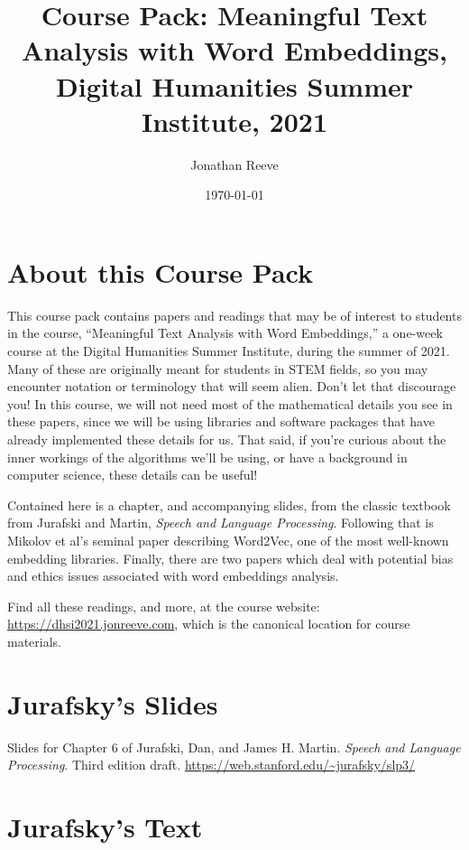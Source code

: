 \documentclass[a4paper]{report}
\title{Course Pack: Meaningful Text Analysis with Word Embeddings, Digital Humanities Summer Institute, 2021}
\author{Jonathan Reeve}
\date{\today}
\begin{document}
\maketitle

\tableofcontents

\chapter{About this Course Pack}

This course pack contains papers and readings that may be of interest to students in the course, ``Meaningful Text Analysis with Word Embeddings,'' a one-week course at the Digital Humanities Summer Institute, during the summer of 2021. Many of these are originally meant for students in STEM fields, so you may encounter notation or terminology that will seem alien. Don't let that discourage you! In this course, we will not need most of the mathematical details you see in these papers, since we will be using libraries and software packages that have already implemented these details for us. That said, if you're curious about the inner workings of the algorithms we'll be using, or have a background in computer science, these details can be useful!

Contained here is a chapter, and accompanying slides, from the classic textbook from Jurafski and Martin, \emph{Speech and Language Processing}. Following that is Mikolov et al's seminal paper describing Word2Vec, one of the most well-known embedding libraries. Finally, there are two papers which deal with potential bias and ethics issues associated with word embeddings analysis.

Find all these readings, and more, at the course website: \url{https://dhsi2021.jonreeve.com}, which is the canonical location for course materials.

\chapter{Jurafsky's Slides}

Slides for Chapter 6 of Jurafski, Dan, and James H. Martin. \emph{Speech and Language Processing}. Third edition draft. \url{https://web.stanford.edu/~jurafsky/slp3/}

  

\chapter{Jurafsky's Text}
\end{document}
